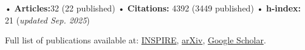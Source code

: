 

• \textbf{Articles:}32 (22 published) \quad • \textbf{Citations:} 4392 (3449 published) \quad • \textbf{h-index:} 21 \quad (\textit{updated Sep. 2025})  

Full list of publications available at: \href{https://inspirehep.net/authors/2107093?ui-citation-summary=true}{INSPIRE}, 
\href{https://arxiv.org/a/noriega_h_1.html}{arXiv},
\href{https://scholar.google.com/citations?user=y2QA6FUAAAAJ&hl=es}{Google Scholar}.

\vspace{0.3cm}


\nocite{*}


\printbibliography[heading={subbibliography},title={Major Author}, keyword={major}]


\printbibheading[heading=subbibliography, title={\textsc{Contributing Author}\footnote{Papers signed as part of the DESI Collaboration due to contributions to key and supporting papers.}}]

